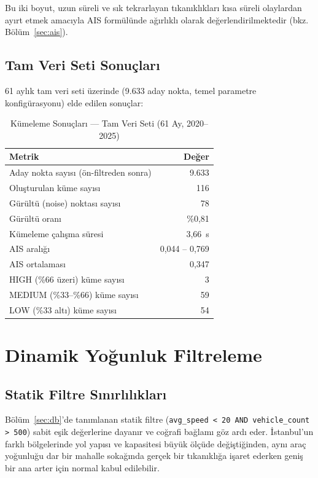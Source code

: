 \documentclass[12pt,a4paper]{article}
\begin{document}
Bu iki boyut, uzun süreli ve sık tekrarlayan tıkanıklıkları kısa süreli olaylardan ayırt etmek amacıyla AIS formülünde ağırlıklı olarak değerlendirilmektedir (bkz. Bölüm~\ref{sec:ais}).

\subsection{Tam Veri Seti Sonuçları}

61 aylık tam veri seti üzerinde (9.633 aday nokta, temel parametre konfigürasyonu) elde edilen sonuçlar:

\begin{table}[H]
\centering
\caption{Kümeleme Sonuçları — Tam Veri Seti (61 Ay, 2020--2025)}
\label{tab:cluster-results}
\begin{tabular}{l r}
\toprule
\textbf{Metrik} & \textbf{Değer} \\
\midrule
Aday nokta sayısı (ön-filtreden sonra) & 9.633 \\
Oluşturulan küme sayısı & 116 \\
Gürültü (noise) noktası sayısı & 78 \\
Gürültü oranı & \%0,81 \\
Kümeleme çalışma süresi & 3,66~s \\
\midrule
AIS aralığı & 0,044 -- 0,769 \\
AIS ortalaması & 0,347 \\
\midrule
HIGH (\%66 üzeri) küme sayısı & 3 \\
MEDIUM (\%33--\%66) küme sayısı & 59 \\
LOW (\%33 altı) küme sayısı & 54 \\
\bottomrule
\end{tabular}
\end{table}

\section{Dinamik Yoğunluk Filtreleme}

\subsection{Statik Filtre Sınırlılıkları}

Bölüm~\ref{sec:db}'de tanımlanan statik filtre (\texttt{avg\_speed < 20 AND vehicle\_count > 500}) sabit eşik değerlerine dayanır ve coğrafi bağlamı göz ardı eder. İstanbul'un farklı bölgelerinde yol yapısı ve kapasitesi büyük ölçüde değiştiğinden, aynı araç yoğunluğu dar bir mahalle sokağında gerçek bir tıkanıklığa işaret ederken geniş bir ana arter için normal kabul edilebilir.
\end{document}
